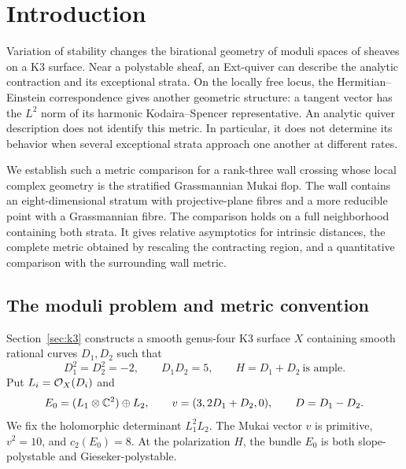 \section{Introduction}\label{sec:introduction}

Variation of stability changes the birational geometry of moduli spaces
of sheaves on a K3 surface. Near a polystable sheaf, an Ext-quiver can
describe the analytic contraction and its exceptional strata. On the
locally free locus, the Hermitian--Einstein correspondence gives another
geometric structure: a tangent vector has the $L^2$ norm of its harmonic
Kodaira--Spencer representative. An analytic quiver description does not
identify this metric. In particular, it does not determine its behavior
when several exceptional strata approach one another at different rates.

We establish such a metric comparison for a rank-three wall crossing whose
local complex geometry is the stratified Grassmannian Mukai flop. The wall
contains an eight-dimensional stratum with projective-plane fibres and a
more reducible point with a Grassmannian fibre. The comparison holds on a
full neighborhood containing both strata. It gives relative asymptotics
for intrinsic distances, the complete metric obtained by rescaling the
contracting region, and a quantitative comparison with the surrounding
wall metric.

\subsection{The moduli problem and metric convention}

Section~\ref{sec:k3} constructs a smooth genus-four K3 surface $X$ containing
smooth rational curves $D_1,D_2$ such that
\begin{equation}\label{eq:intersection-intro}
D_1^2=D_2^2=-2,\qquad D_1D_2=5,\qquad H=D_1+D_2\ \text{is ample}.
\end{equation}
Put $L_i=\mathcal O_X(D_i)$ and
\[
E_0=(L_1\otimes\mathbb C^2)\oplus L_2,\qquad
v=(3,2D_1+D_2,0),\qquad D=D_1-D_2.
\]
We fix the holomorphic determinant $L_1^2L_2$. The Mukai vector $v$ is
primitive, $v^2=10$, and $c_2(E_0)=8$. At the polarization $H$, the
bundle $E_0$ is both slope-polystable and Gieseker-polystable.

